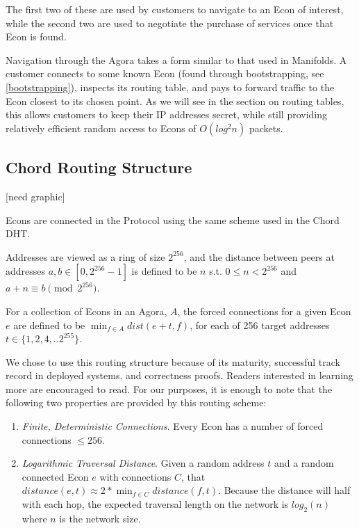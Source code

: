 The first two of these are used by customers to navigate to an Econ of
interest, while the second two are used to negotiate the purchase of
services once that Econ is found.

Navigation through the Agora takes a form similar to that used in
Manifolds. A customer connects to some known Econ (found through
bootstrapping, see \ref{bootstrapping}), inspects its routing table,
and pays to forward traffic to the Econ closest to its chosen
point. As we will see in the section on routing tables, this allows
customers to keep their IP addresses secret, while still providing
relatively efficient random access to Econs of $O(log^2 n)$ packets.

\subsection{Chord Routing Structure}

[need graphic]

Econs are connected in the \Orchid{} Protocol using the same scheme used
in the Chord DHT.

Addresses are viewed as a ring of size $2^{256}$, and the distance
between peers at addresses $a, b \in [0, 2^{256}-1]$ is defined to be
$n$ s.t. $0 \leq n < 2^{256}$ and $a + n \equiv b \pmod{2^{256}}$.

For a collection of Econs in an Agora, $A$, the forced connections for
a given Econ $e$ are defined to be $\min_{f \in A} dist(e+t, f)$, for
each of 256 target addresses $t \in \{1, 2, 4, .. 2^{255}\}$.

We chose to use this routing structure because of its maturity,
successful track record in deployed systems, and correctness
proofs. Readers interested in learning more are encouraged to
read\cite{CHORD}. For our purposes, it is enough to note that the
following two properties are provided by this routing scheme:

\begin{enumerate}
\item \emph{Finite, Deterministic Connections}. Every Econ has a
  number of forced connections $\leq 256$.
\item \emph{Logarithmic Traversal Distance}. Given a random address
  $t$ and a random connected Econ $e$ with connections $C$, that
  $distance(e, t) \approx 2 * \min_{f \in C} distance(f, t)$. Because
  the distance will half with each hop, the expected traversal length
  on the network is $log_2(n)$ where $n$ is the network size.
\end{enumerate}

